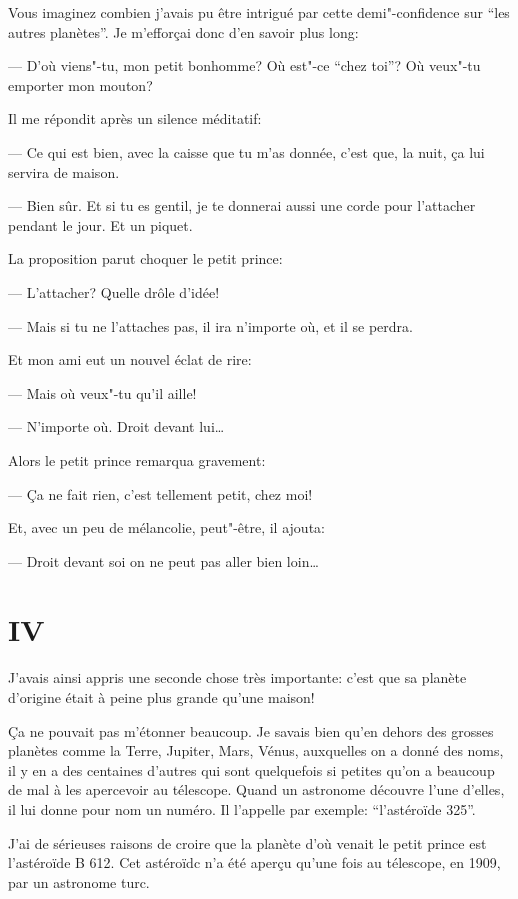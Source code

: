 \begin{Parallel}[p]{}{}
{\medskip

Vous imaginez combien j'avais pu être intrigué
par cette demi"-confidence sur ``les autres planètes''.
Je m'efforçai donc d'en savoir plus long:

--- D'où viens"-tu, mon petit bonhomme? Où est"-ce
``chez toi''? Où veux"-tu emporter mon mouton?

Il me répondit après un silence méditatif:

--- Ce qui est bien, avec la caisse que tu m'as donnée, c'est que, la nuit, ça lui servira de maison.

--- Bien sûr. Et si tu es gentil, je te donnerai aussi
une corde pour l'attacher pendant le jour. Et un
piquet.

La proposition parut choquer le petit prince:

--- L'attacher? Quelle drôle d'idée!

--- Mais si tu ne l'attaches pas, il ira n'importe où,
et il se perdra.

Et mon ami eut un nouvel éclat de rire:

--- Mais où veux"-tu qu'il aille!

--- N'importe où. Droit devant lui\ldots{}

Alors le petit prince remarqua gravement:

--- Ça ne fait rien, c'est tellement petit, chez moi!

Et, avec un peu de mélancolie, peut"-être, il
ajouta:

--- Droit devant soi on ne peut pas aller bien loin\ldots{}

\section{IV}

J'avais ainsi appris une seconde chose très importante: c'est que sa planète d'origine était à peine
plus grande qu'une maison!

Ça ne pouvait pas m'étonner beaucoup. Je savais
bien qu'en dehors des grosses planètes comme la
Terre, Jupiter, Mars, Vénus, auxquelles on a donné des
noms, il y en a des centaines d'autres
qui sont quelquefois si petites qu'on a
beaucoup de mal à les apercevoir au télescope. Quand
un astronome découvre l'une d'elles, il lui donne pour
nom un numéro. Il l'appelle par exemple: ``l'astéroïde 325''.

J'ai de sérieuses raisons de croire que la planète d'où venait le petit prince est l'astéroïde B 612.
Cet astéroïdc n'a été aperçu qu'une fois au télescope, en 1909, par un astronome turc.

}
\end{Parallel}
